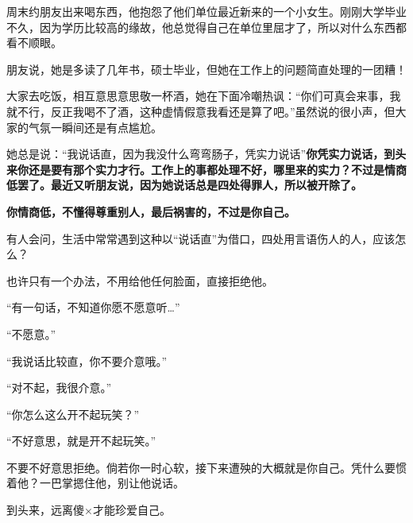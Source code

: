 \documentclass[UTF8,a4paper,8pt]{ctexbook}
\begin{document}
	
	周末约朋友出来喝东西，他抱怨了他们单位最近新来的一个小女生。刚刚大学毕业不久，因为学历比较高的缘故，他总觉得自己在单位里屈才了，所以对什么东西都看不顺眼。
	
	朋友说，她是多读了几年书，硕士毕业，但她在工作上的问题简直处理的一团糟！
	
	大家去吃饭，相互意思意思敬一杯酒，她在下面冷嘲热讽：“你们可真会来事，我就不行，反正我喝不了酒，这种虚情假意我看还是算了吧。”虽然说的很小声，但大家的气氛一瞬间还是有点尴尬。
	
	她总是说：“我说话直，因为我没什么弯弯肠子，凭实力说话”\textbf{你凭实力说话，到头来你还是要有那个实力才行。工作上的事都处理不好，哪里来的实力？不过是情商低罢了。最近又听朋友说，因为她说话总是四处得罪人，所以被开除了。}
	
	\textbf{你情商低，不懂得尊重别人，最后祸害的，不过是你自己。}
	
	有人会问，生活中常常遇到这种以“说话直”为借口，四处用言语伤人的人，应该怎么？
	
	也许只有一个办法，不用给他任何脸面，直接拒绝他。
	
	“有一句话，不知道你愿不愿意听…”
	
	“不愿意。”
	
	“我说话比较直，你不要介意哦。”
	
	“对不起，我很介意。”
	
	“你怎么这么开不起玩笑？”
	
	“不好意思，就是开不起玩笑。”
	
	不要不好意思拒绝。倘若你一时心软，接下来遭殃的大概就是你自己。凭什么要惯着他？一巴掌摁住他，别让他说话。
	
	到头来，远离傻×才能珍爱自己。
	
\newpage
\end{document}
